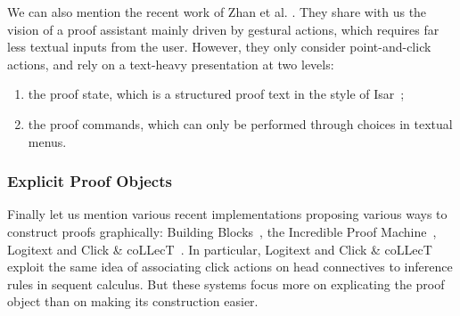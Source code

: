 We can also mention the recent work of Zhan et
al. \cite{zhan-design-2019}. They share with us the vision of a proof assistant
mainly driven by gestural actions, which requires far less textual inputs from
the user. However, they only consider point-and-click actions, and rely on a
text-heavy presentation at two levels:
\begin{enumerate}
  \item the proof state, which is a structured proof text in the style of Isar~\cite{isar};
  \item the proof commands, which can only be performed through choices in textual menus.
\end{enumerate}


\subsubsection*{Explicit Proof Objects}
Finally let us mention various recent implementations proposing various ways to
construct proofs graphically: Building Blocks~\cite{buildingblocks}, the
Incredible Proof Machine~\cite{blanchette-visual-2016},
Logitext and Click \&
coLLecT~\cite{clickcollect}. In particular, Logitext and Click \& coLLecT
exploit the same idea of associating click actions on head connectives to
inference rules in sequent calculus. But these systems focus more on explicating
the proof object than on making its construction easier.

